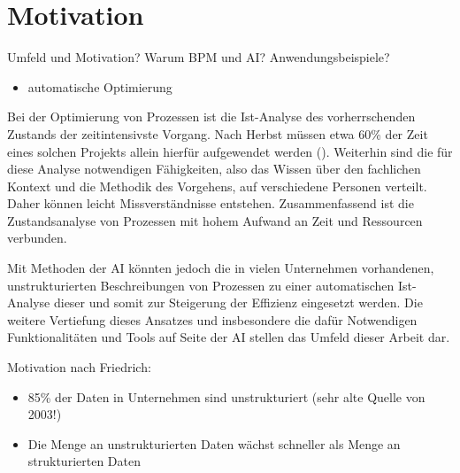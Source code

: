 \section{Motivation}

Umfeld und Motivation?
Warum BPM und AI? Anwendungsbeispiele?
\begin{itemize} 
\item automatische Optimierung
\end{itemize}

Bei der Optimierung von Prozessen ist die Ist-Analyse des vorherrschenden Zustands der zeitintensivste Vorgang. Nach Herbst müssen etwa 60\% der Zeit eines solchen Projekts allein hierfür aufgewendet werden (\cite[vgl.][1]{HERBST}). Weiterhin sind die für diese Analyse notwendigen Fähigkeiten, also das Wissen über den fachlichen Kontext und die Methodik des Vorgehens, auf verschiedene Personen verteilt. Daher können leicht Missverständnisse entstehen. Zusammenfassend ist die Zustandsanalyse von Prozessen mit hohem Aufwand an Zeit und Ressourcen verbunden.\par
Mit Methoden der \ac{AI} könnten jedoch die in vielen Unternehmen vorhandenen, unstrukturierten Beschreibungen von Prozessen zu einer automatischen Ist-Analyse dieser und somit zur Steigerung der Effizienz eingesetzt werden. Die weitere Vertiefung dieses Ansatzes und insbesondere die dafür Notwendigen Funktionalitäten und Tools auf Seite der \ac{AI} stellen das Umfeld dieser Arbeit dar.

Motivation nach Friedrich:
\begin{itemize} 
\item 85\% der Daten in Unternehmen sind unstrukturiert (sehr alte Quelle von 2003!)
\item Die Menge an unstrukturierten Daten wächst schneller als Menge an strukturierten Daten

\end{itemize}
